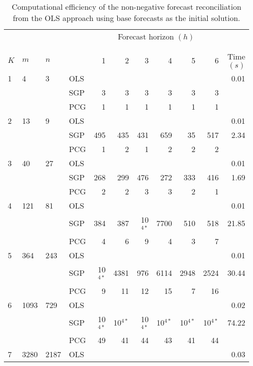 \documentclass[11pt]{article}
\newcommand{\0}{\phantom{0}}
\begin{document}
\begin{table}[ht]
	\small
	\tabcolsep=0.20cm
	\caption{Computational efficiency of the non-negative forecast reconciliation from the OLS approach using base forecasts as the initial solution.}
	\label{tbl:perfnnolsb}
	\centering
	\begin{threeparttable}
		\begin{tabular}{llllrrrrrrr}
			\toprule
			& & & & \multicolumn{6}{c}{Forecast horizon $(h)$}\\[-0.3cm]\\\cline{5-10}\\[-0.3cm]
			$K$ & $m$ & $n$ & & 1 & 2 & 3 & 4 & 5 & 6 & Time $(s)$\\
			\midrule
			1 & 4 & 3 & OLS & & & & & & & 0.01\\
			& & & SGP & 3 & 3 & 3 & 3 & 3 & 3 & \bm{$0.03$} \\
			& & & PCG & 1 & 1 & 1 & 1 & 1 & 1 & \bm{$0.03$} \\
			\midrule
			2 & 13 & 9 & OLS & & & & & & & 0.01 \\
			& & & SGP & 495 & 435 & 431 & 659 & 35 & 517 & 2.34 \\
			& & & PCG & 1 & 2 & 1 & 2 & 2 & 2 & \bm{$0.11$} \\
			\midrule
			3 & 40 & 27 & OLS & & & & & & & 0.01 \\
			& & & SGP & 268 & 299 & 476 & 272 & 333 & 416 & 1.69 \\
			& & & PCG & 2 & 2 & 3 & 3 & 2 & 1 & \bm{$0.15$} \\
			\midrule
			4 & 121 & 81 & OLS & & & & & & & 0.01 \\
			& & & SGP & 384 & 387 & 10$^{4*}$ & 7700 & 510 & 518 & 21.85 \\
			& & & PCG & 4 & 6 & 9 & 4 & 3 & 7 & \bm{$0.30$} \\
			\midrule
			5 & 364 & 243 & OLS & & & & & & & 0.01 \\
			& & & SGP & 10$^{4*}$ & 4381 & 976 & 6114 & 2948 & 2524 & 30.44 \\
			& & & PCG & 9 & 11 & 12 & 15 & 7 & 16 & \bm{$0.53$} \\
			\midrule
			6 & 1093 & 729 & OLS & & & & & & & 0.02 \\
			& & & SGP & 10$^{4*}$ & 10$^{4*}$ & 10$^{4*}$ & 10$^{4*}$ & 10$^{4*}$ & 10$^{4*}$ & 74.22 \\
			& & & PCG & 49 & 41 & 44 & 43 & 41 & 44 & \bm{$1.32$} \\
			\midrule
			7 & 3280 & 2187 & OLS & & & & & & & 0.03 \\

\end{tabular}
\end{threeparttable}
\end{table}
\end{document}
